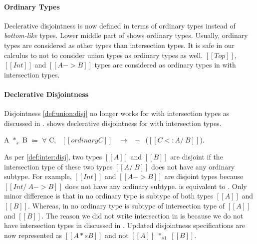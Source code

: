 \paragraph{Ordinary Types}
Declerative disjointness is now defined in terms of ordinary types instead of \emph{bottom-like} types.
Lower middle part of
 shows ordinary types. Usually, ordinary types are considered as other types than
intersection types. It is safe in our calculus to not to consider union types as ordinary types as well.
$[[Top]]$, $[[Int]]$ and $[[A -> B]]$ types are considered as ordinary types in \cal with intersection
types.

\paragraph{Declerative Disjointness}
Disjointness \cref{def:union:disj} no longer works for \cal with intersection types as discussed in
.
 shows declerative disjointness for \cal with intersection types.

\begin{definition}
\label{def:inter:disj}
  A $*_s$ B $\Coloneqq$ $\forall$ C, \ $[[ordinary C]]$ \ $\rightarrow$ \ $\neg$ \ ($[[C <: A /\ B]]$).
\end{definition}

\noindent As per \cref{def:inter:disj}, two types $[[A]]$ and $[[B]]$ are disjoint if the intersection type
of these two types $[[A /\ B]]$ does not have any ordinary subtype. For example, $[[Int]]$ and
$[[A -> B]]$ are disjoint types because $[[Int /\ A -> B]]$ does not have any ordinary subtype.
 is equivalent to . Only minor difference is that
in  no ordinary type is subtype of both types $[[A]]$ and $[[B]]$. Whereas,
in  no ordinary type is subtype of intersection type of $[[A]]$ and $[[B]]$.
The reason we did not write intersection in  is because we do not have
intersection types in \cal discussed in . Updated disjointness specifications are
now represented as $[[A *s B]]$ and not $[[A]]$ $*_{s1}$ $[[B]]$.

